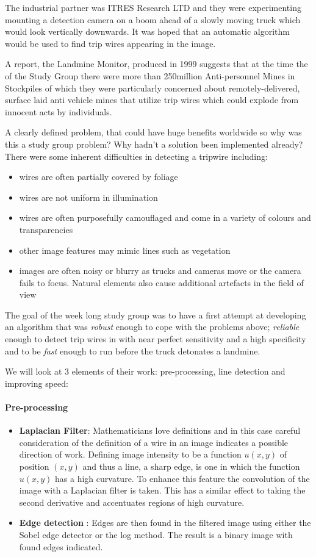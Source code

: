 \documentclass[11pt]{article} %
\begin{document}
The industrial partner was ITRES Research LTD and they were experimenting mounting a detection camera on a boom ahead of a slowly moving truck which would look vertically downwards. It was hoped that an automatic algorithm would be used to find trip wires appearing in the image. 
	
	A report, the Landmine Monitor, produced in 1999 \cite{landmine} suggests that at the time the of the Study Group there were more than 250million Anti-personnel Mines in Stockpiles of which they were particularly concerned about remotely-delivered, surface laid anti vehicle mines that utilize trip wires which could explode from innocent acts by individuals. 
	
	A clearly defined  problem, that could have huge benefits worldwide so why was this a study group problem? Why hadn't a solution been implemented already? There were some inherent difficulties in detecting a tripwire including:
	\begin{itemize}
	\item wires are often partially covered by foliage
	\item wires are not uniform in illumination 
	\item wires are often purposefully camouflaged and come in a variety of colours and transparencies
	\item other image features may mimic lines such as vegetation 
	\item images are often noisy or blurry as trucks and cameras move or the camera fails to focus. Natural elements also cause additional artefacts in the field of view
	\end{itemize}
	The goal of the week long study group was to have a first attempt at developing an algorithm that was \textsl{robust} enough to cope with the problems above; \textit{reliable }enough to detect trip wires in with near perfect sensitivity and a high specificity and to be \textit{fast} enough to run before the truck detonates a landmine. 
	
	We will look at 3 elements of their work: pre-processing, line detection and improving speed:
	\paragraph{Pre-processing}
\begin{itemize}
	\item \textbf{Laplacian Filter}: Mathematicians love definitions and in this case careful consideration of the definition of a wire in an image indicates a possible direction of work. Defining image intensity to be a function $u(x,y)$ of position $(x,y)$ and thus a line, a sharp edge, is one in which the function $u(x,y) $ has a high curvature.
	To enhance this feature the convolution of the image with a Laplacian filter is taken. This has a similar effect to taking the second derivative and accentuates regions of high curvature.	
	\item \textbf{Edge detection }: Edges are then found in the filtered image using either the Sobel edge detector or the log method. The result is a binary image with found edges indicated. 
	\end{itemize}
	
\end{document}
